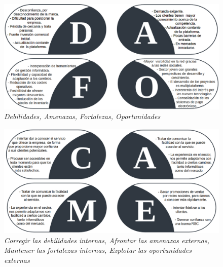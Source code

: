 \documentclass[openany,overnay,a4paper, twoside, 12pt]{book}
\begin{document}
\begin{figure}[h]
\centering

\includegraphics[scale = 0.39]{imagenes/DAFO.png}
\renewcommand{\figurename}{DAFO}
\renewcommand{\thefigure}{}
\caption{\textit{Debilidades, Amenazas, Fortalezas, Oportunidades}}
\end{figure}
\begin{figure}[h]
\centering
\renewcommand{\figurename}{CAME}

\includegraphics[scale = 0.39]{imagenes/CAME.png}
\renewcommand{\thefigure}{}
\caption{\textit{Corregir las debilidades internas, Afrontar las amenazas externas, Mantener las fortalezas internas, Explotar las oportunidades externas}}
\end{figure}
\newpage
\end{document}
